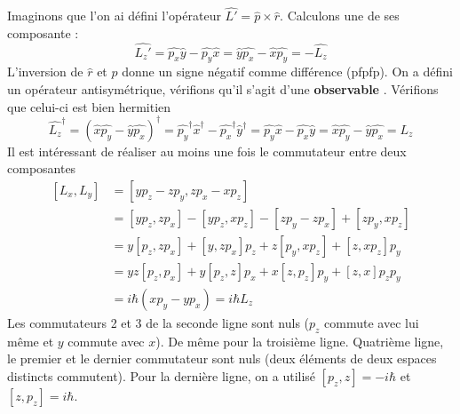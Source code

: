 	Imaginons que l'on ai défini l'opérateur $\hat{L'}=\hat{p}\times\hat{r}$. Calculons une de 
	ses composante :
	\begin{equation}
	\hat{L_z'} = \hat{p_x}\hat{y}-\hat{p_y}\hat{x} = \hat{y}\hat{p_x}-\hat{x}\hat{p_y}=-\hat{L_z}
	\end{equation}
	L'inversion de $\hat{r}$ et $\hat{p}$ donne un signe négatif comme différence (pfpfp). On a 
	défini un opérateur antisymétrique, vérifions qu'il s'agit d'une \textbf{observable}%
	. Vérifions que celui-ci est bien hermitien
	\begin{equation}
	\hat{L_z}^\dagger = (\hat{x}\hat{p_y}-\hat{y}\hat{p_x})^\dagger = \hat{p_y}^\dagger\hat{x}^\dagger
	-\hat{p_x}^\dagger\hat{y}^\dagger=\hat{p_y}\hat{x}-\hat{p_x}\hat{y} = \hat{x}\hat{p_y}-\hat{y}
	\hat{p_x} = L_z
	\end{equation}
	Il est intéressant de réaliser au moins une fois le commutateur entre deux composantes
	\begin{equation}
	\begin{array}{ll}
	[L_x,L_y] &= [yp_z-zp_y, zp_x-xp_z]\\
	&= [yp_z,zp_x]-[yp_z,xp_z]-[zp_y-zp_x]+[zp_y,xp_z]\\
	&=y[p_z,zp_x]+[y,zp_x]p_z+z[p_y,xp_z]+[z,xp_z]p_y\\
	&= yz[p_z,p_x]+y[p_z,z]p_x+x[z,p_z]p_y+[z,x]p_zp_y\\
	&= i\hbar(xp_y-yp_x) = i\hbar L_z
	\end{array}
	\end{equation}
	Les commutateurs 2 et 3 de la seconde ligne sont nuls ($p_z$ commute avec lui même et $y$ 
	commute avec $x$). De même pour la troisième ligne. Quatrième ligne, le premier et le dernier 
	commutateur sont nuls (deux éléments de deux espaces distincts commutent). Pour la dernière 
	ligne, on a utilisé $[p_z,z] = -i\hbar$ et $[z,p_z]=i\hbar$.\\
	
